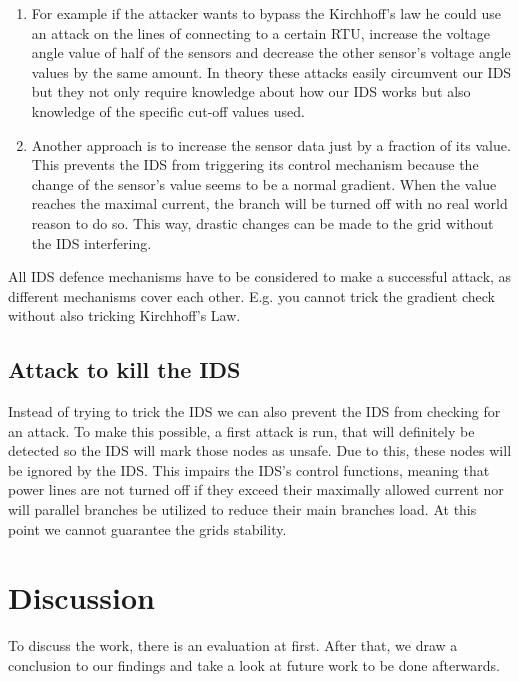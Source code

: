 \documentclass[conference]{IEEEtran}
\begin{document}
		\begin{enumerate}
			\item For example if the attacker wants to bypass the Kirchhoff’s law he could use an attack on the lines of connecting to a certain RTU, increase the voltage angle value of half of the sensors and	decrease the other sensor’s voltage angle values by the same amount. In theory these attacks easily circumvent our IDS but they not only require knowledge about how our IDS works but also knowledge of the specific cut-off values used.
			
			\item Another approach is to increase the sensor data just by a fraction of its value. This prevents the IDS from triggering its control mechanism because the change of the sensor's value seems to be a normal gradient. When the value reaches the maximal current, the branch will be turned off with no real world reason to do so. This way, drastic changes can be made to the grid without the IDS interfering.
		\end{enumerate}
	
		All IDS defence mechanisms have to be considered to make a successful attack, as different mechanisms cover each other. E.g. you cannot trick the gradient check without also tricking Kirchhoff's Law.
		
	\subsection{Attack to kill the IDS}
		
		Instead of trying to trick the IDS we can also prevent the IDS from checking for an attack. To make this possible, a first attack is run, that will definitely be detected so the IDS will mark those nodes as unsafe. Due to this, these nodes will be ignored by the IDS. This impairs the IDS's control functions, meaning that power lines are not turned off if they exceed their maximally allowed current nor will parallel branches be utilized to reduce their main branches load. At this point we cannot guarantee the grids stability.

\section{Discussion}

	To discuss the work, there is an evaluation at first. After that, we draw a conclusion to our findings and take a look at future work to be done afterwards.
	
\end{document}

